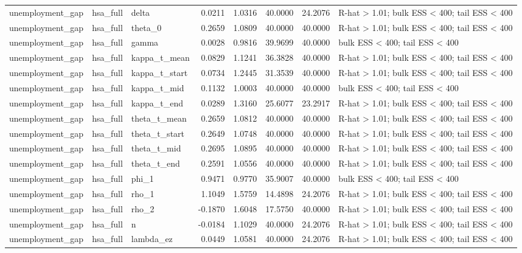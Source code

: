 \begin{tabular}{lllrrrrl}
unemployment\_gap & hsa\_full & delta & 0.0211 & 1.0316 & 40.0000 & 24.2076 & R-hat > 1.01; bulk ESS < 400; tail ESS < 400 \\
unemployment\_gap & hsa\_full & theta\_0 & 0.2659 & 1.0809 & 40.0000 & 40.0000 & R-hat > 1.01; bulk ESS < 400; tail ESS < 400 \\
unemployment\_gap & hsa\_full & gamma & 0.0028 & 0.9816 & 39.9699 & 40.0000 & bulk ESS < 400; tail ESS < 400 \\
unemployment\_gap & hsa\_full & kappa\_t\_mean & 0.0829 & 1.1241 & 36.3828 & 40.0000 & R-hat > 1.01; bulk ESS < 400; tail ESS < 400 \\
unemployment\_gap & hsa\_full & kappa\_t\_start & 0.0734 & 1.2445 & 31.3539 & 40.0000 & R-hat > 1.01; bulk ESS < 400; tail ESS < 400 \\
unemployment\_gap & hsa\_full & kappa\_t\_mid & 0.1132 & 1.0003 & 40.0000 & 40.0000 & bulk ESS < 400; tail ESS < 400 \\
unemployment\_gap & hsa\_full & kappa\_t\_end & 0.0289 & 1.3160 & 25.6077 & 23.2917 & R-hat > 1.01; bulk ESS < 400; tail ESS < 400 \\
unemployment\_gap & hsa\_full & theta\_t\_mean & 0.2659 & 1.0812 & 40.0000 & 40.0000 & R-hat > 1.01; bulk ESS < 400; tail ESS < 400 \\
unemployment\_gap & hsa\_full & theta\_t\_start & 0.2649 & 1.0748 & 40.0000 & 40.0000 & R-hat > 1.01; bulk ESS < 400; tail ESS < 400 \\
unemployment\_gap & hsa\_full & theta\_t\_mid & 0.2695 & 1.0895 & 40.0000 & 40.0000 & R-hat > 1.01; bulk ESS < 400; tail ESS < 400 \\
unemployment\_gap & hsa\_full & theta\_t\_end & 0.2591 & 1.0556 & 40.0000 & 40.0000 & R-hat > 1.01; bulk ESS < 400; tail ESS < 400 \\
unemployment\_gap & hsa\_full & phi\_1 & 0.9471 & 0.9770 & 35.9007 & 40.0000 & bulk ESS < 400; tail ESS < 400 \\
unemployment\_gap & hsa\_full & rho\_1 & 1.1049 & 1.5759 & 14.4898 & 24.2076 & R-hat > 1.01; bulk ESS < 400; tail ESS < 400 \\
unemployment\_gap & hsa\_full & rho\_2 & -0.1870 & 1.6048 & 17.5750 & 40.0000 & R-hat > 1.01; bulk ESS < 400; tail ESS < 400 \\
unemployment\_gap & hsa\_full & n & -0.0184 & 1.1029 & 40.0000 & 24.2076 & R-hat > 1.01; bulk ESS < 400; tail ESS < 400 \\
unemployment\_gap & hsa\_full & lambda\_ez & 0.0449 & 1.0581 & 40.0000 & 24.2076 & R-hat > 1.01; bulk ESS < 400; tail ESS < 400 \\

\end{tabular}
